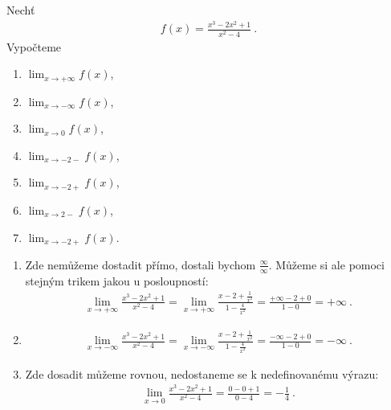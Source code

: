 \begin{example}
    Nechť \begin{align}
        f(x) = \frac{x^3-2x^2+1}{x^2-4} \:.
    \end{align}
    Vypočteme
    \begin{enumerate}[label=(\roman*)]
        \item $\lim_{x \rightarrow +\infty} f(x)$,
        \item $\lim_{x \rightarrow -\infty} f(x)$,
        \item $\lim_{x \rightarrow 0} f(x)$,
        \item $\lim_{x \rightarrow -2 -} f(x)$,
        \item $\lim_{x \rightarrow -2 +} f(x)$,
        \item $\lim_{x \rightarrow 2 -} f(x)$,
        \item $\lim_{x \rightarrow -2 +} f(x)$.
    \end{enumerate}

    \begin{enumerate}[label=(\roman*)]
        \item Zde nemůžeme dostadit přímo, dostali bychom $\frac{\infty}{\infty}$. Můžeme si ale pomoci stejným trikem jakou u posloupností: \begin{align}
            \lim_{x \rightarrow +\infty} \frac{x^3-2x^2+1}{x^2-4} =
            \lim_{x \rightarrow +\infty} \frac{x - 2 + \frac{1}{x^2}}{1 - \frac{4}{x^2}} =
            \frac{+\infty - 2 + 0}{1 - 0} = + \infty \:.
        \end{align}

        \item \begin{align}
            \lim_{x \rightarrow -\infty} \frac{x^3-2x^2+1}{x^2-4} =
            \lim_{x \rightarrow -\infty} \frac{x - 2 + \frac{1}{x^2}}{1 - \frac{4}{x^2}} =
            \frac{-\infty - 2 + 0}{1 - 0} = - \infty \:.
        \end{align}

        \item Zde dosadit můžeme rovnou, nedostaneme se k nedefinovanému výrazu: \begin{align}
            \lim_{x \rightarrow 0} \frac{x^3-2x^2+1}{x^2-4} =
            \frac{0-0+1}{0-4} = - \frac{1}{4} \:.
        \end{align}


\end{enumerate}
\end{example}
